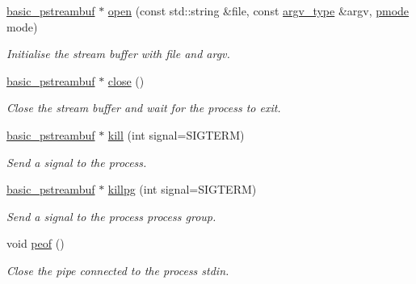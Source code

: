 \begin{DoxyCompactItemize}
\mbox{\hyperlink{classredi_1_1basic__pstreambuf}{basic\+\_\+pstreambuf}} $\ast$ \mbox{\hyperlink{classredi_1_1basic__pstreambuf_a2dd6e94de1a2fa0e9e4505934b246aec}{open}} (const std\+::string \&file, const \mbox{\hyperlink{structredi_1_1pstreams_af902b894b095c1875e96c10129489467}{argv\+\_\+type}} \&argv, \mbox{\hyperlink{structredi_1_1pstreams_a1eae4aad88812af03a0fbb3ec13c50b7}{pmode}} mode)
\begin{DoxyCompactList}\small\item\em Initialise the stream buffer with {\itshape file} and {\itshape argv}. \end{DoxyCompactList}\item 
\mbox{\hyperlink{classredi_1_1basic__pstreambuf}{basic\+\_\+pstreambuf}} $\ast$ \mbox{\hyperlink{classredi_1_1basic__pstreambuf_a725edcfa569034899d63312fa8d98791}{close}} ()
\begin{DoxyCompactList}\small\item\em Close the stream buffer and wait for the process to exit. \end{DoxyCompactList}\item 
\mbox{\hyperlink{classredi_1_1basic__pstreambuf}{basic\+\_\+pstreambuf}} $\ast$ \mbox{\hyperlink{classredi_1_1basic__pstreambuf_a6648f57f7aa212f986365101a66d5350}{kill}} (int signal=S\+I\+G\+T\+E\+RM)
\begin{DoxyCompactList}\small\item\em Send a signal to the process. \end{DoxyCompactList}\item 
\mbox{\hyperlink{classredi_1_1basic__pstreambuf}{basic\+\_\+pstreambuf}} $\ast$ \mbox{\hyperlink{classredi_1_1basic__pstreambuf_a151b701c789459216e92bd7b76d59872}{killpg}} (int signal=S\+I\+G\+T\+E\+RM)
\begin{DoxyCompactList}\small\item\em Send a signal to the process\textquotesingle{} process group. \end{DoxyCompactList}\item 
void \mbox{\hyperlink{classredi_1_1basic__pstreambuf_a6937e84719c4eaf08f2a2e514ff98e93}{peof}} ()
\begin{DoxyCompactList}\small\item\em Close the pipe connected to the process\textquotesingle{} stdin. \end{DoxyCompactList}\item 
\mbox{\label{classredi_1_1basic__pstreambuf_a9a92bd02d774f26d6165f99bb5661bce}} 

\end{DoxyCompactItemize}
